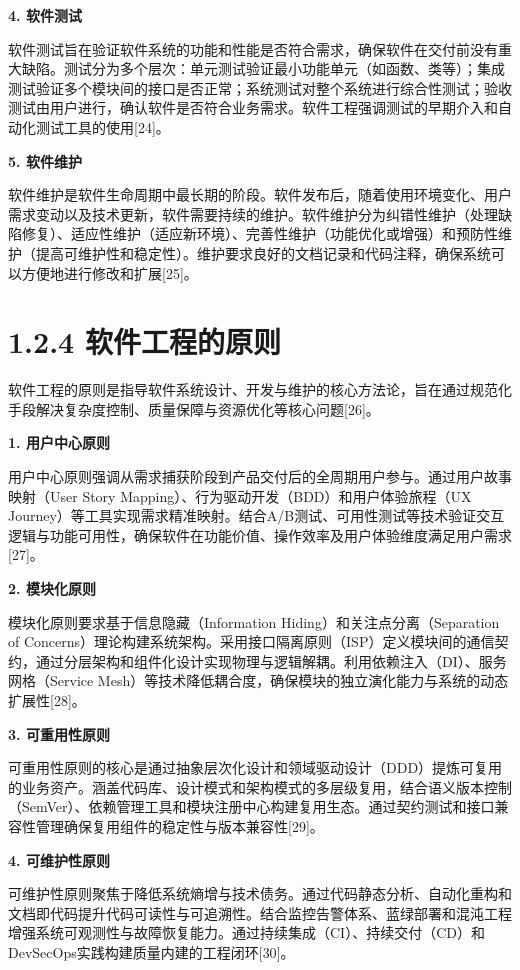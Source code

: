 \documentclass[12pt,a4paper]{ctexbook}
\begin{document}
\textbf{4. 软件测试}

软件测试旨在验证软件系统的功能和性能是否符合需求，确保软件在交付前没有重大缺陷。测试分为多个层次：单元测试验证最小功能单元（如函数、类等）；集成测试验证多个模块间的接口是否正常；系统测试对整个系统进行综合性测试；验收测试由用户进行，确认软件是否符合业务需求。软件工程强调测试的早期介入和自动化测试工具的使用{[}24{]}。

\textbf{5. 软件维护}

软件维护是软件生命周期中最长期的阶段。软件发布后，随着使用环境变化、用户需求变动以及技术更新，软件需要持续的维护。软件维护分为纠错性维护（处理缺陷修复）、适应性维护（适应新环境）、完善性维护（功能优化或增强）和预防性维护（提高可维护性和稳定性）。维护要求良好的文档记录和代码注释，确保系统可以方便地进行修改和扩展{[}25{]}。


\section{1.2.4
软件工程的原则}\label{ux8f6fux4ef6ux5de5ux7a0bux7684ux539fux5219}

软件工程的原则是指导软件系统设计、开发与维护的核心方法论，旨在通过规范化手段解决复杂度控制、质量保障与资源优化等核心问题{[}26{]}。

\textbf{1. 用户中心原则}

用户中心原则强调从需求捕获阶段到产品交付后的全周期用户参与。通过用户故事映射（User
Story Mapping）、行为驱动开发（BDD）和用户体验旅程（UX
Journey）等工具实现需求精准映射。结合A/B测试、可用性测试等技术验证交互逻辑与功能可用性，确保软件在功能价值、操作效率及用户体验维度满足用户需求{[}27{]}。

\textbf{2. 模块化原则}

模块化原则要求基于信息隐藏（Information Hiding）和关注点分离（Separation
of
Concerns）理论构建系统架构。采用接口隔离原则（ISP）定义模块间的通信契约，通过分层架构和组件化设计实现物理与逻辑解耦。利用依赖注入（DI）、服务网格（Service
Mesh）等技术降低耦合度，确保模块的独立演化能力与系统的动态扩展性{[}28{]}。

\textbf{3. 可重用性原则}

可重用性原则的核心是通过抽象层次化设计和领域驱动设计（DDD）提炼可复用的业务资产。涵盖代码库、设计模式和架构模式的多层级复用，结合语义版本控制（SemVer）、依赖管理工具和模块注册中心构建复用生态。通过契约测试和接口兼容性管理确保复用组件的稳定性与版本兼容性{[}29{]}。

\textbf{4. 可维护性原则}

可维护性原则聚焦于降低系统熵增与技术债务。通过代码静态分析、自动化重构和文档即代码提升代码可读性与可追溯性。结合监控告警体系、蓝绿部署和混沌工程增强系统可观测性与故障恢复能力。通过持续集成（CI）、持续交付（CD）和DevSecOps实践构建质量内建的工程闭环{[}30{]}。
\end{document}

